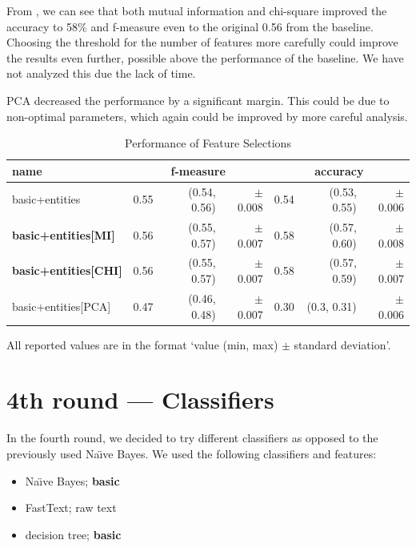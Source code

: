 From , we can see that both mutual information
and chi-square improved the accuracy to 58\% and f-measure even to the original
0.56 from the baseline.
Choosing the threshold for the number of features more carefully could improve the results even further, possible above the performance of the baseline.
We have not analyzed this due the lack of time.

PCA decreased the performance by a significant margin.
This could be due to non-optimal parameters, which
again could be improved by more careful analysis.

\begin{table}[h!]

\centering
\begin{tabular}{lr@{~}r@{~}rr@{~}r@{~}r}
\toprule
\textbf{name}	& \multicolumn{3}{c}{\textbf{f-measure}} & \multicolumn{3}{c}{\textbf{accuracy}} \\

\midrule
basic+entities & 0.55 & (0.54, 0.56) & $\pm$ 0.008 & 0.54 & (0.53, 0.55) & $\pm$ 0.006		\\
\textbf{basic+entities[MI]} & 0.56 & (0.55, 0.57) & $\pm$ 0.007 & 0.58 & (0.57, 0.60) & $\pm$ 0.008 \\
\textbf{basic+entities[CHI]} & 0.56 & (0.55, 0.57) & $\pm$ 0.007 & 0.58 & (0.57, 0.59) & $\pm$ 0.007 \\
basic+entities[PCA] & 0.47 & (0.46, 0.48) & $\pm$ 0.007 & 0.30 & (0.3, 0.31) & $\pm$ 0.006 \\


\bottomrule
\end{tabular}

\caption{Performance of Feature Selections}\label{tab:sel_perf}
All reported values are in the format `value (min, max) $\pm$ standard deviation'.
\end{table}

\section{4th round --- Classifiers}

In the fourth round, we decided to try different classifiers as opposed to the previously used Na\"{\i}ve Bayes.
We used the following classifiers and features:

\begin{itemize}
\item Na\"{\i}ve Bayes; \textbf{basic}
\item FastText; raw text
\item decision tree; \textbf{basic}
\end{itemize}

